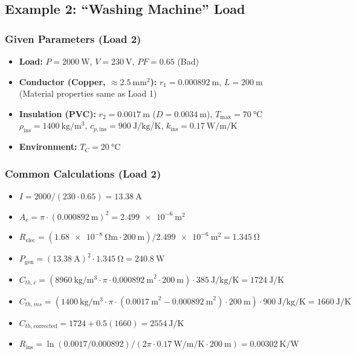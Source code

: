 \documentclass[11pt, a4paper]{article}
\begin{document}
\newpage

\subsection{Example 2: ``Washing Machine'' Load}

\subsubsection{Given Parameters (Load 2)}
\begin{itemize}
    \item \textbf{Load:} $P = \SI{2000}{\watt}$, $V = \SI{230}{\volt}$, $PF = 0.65$ (Bad)
    \item \textbf{Conductor (Copper, $\approx \SI{2.5}{\square\mm}$):}
        $r_1 = \SI{0.000892}{\metre}$, $L = \SI{200}{\metre}$ \\
        (Material properties same as Load 1)
    \item \textbf{Insulation (PVC):}
        $r_2 = \SI{0.0017}{\metre}$ ($D = \SI{0.0034}{\metre}$), $T_{\text{max}} = \SI{70}{\celsius}$ \\
        $\rho_{\text{ins}} = \SI{1400}{\kilogram\per\cubic\metre}$, $c_{p,\text{ins}} = \SI{900}{\joule\per\kilogram\per\kelvin}$, $k_{\text{ins}} = \SI{0.17}{\watt\per\metre\per\kelvin}$
    \item \textbf{Environment:} $T_C = \SI{20}{\celsius}$
\end{itemize}

\subsubsection{Common Calculations (Load 2)}
\begin{itemize}
    \item $I = 2000 / (230 \cdot 0.65) = \SI{13.38}{\ampere}$
    \item $A_c = \pi \cdot (\SI{0.000892}{\metre})^2 = \SI{2.499e-6}{\square\metre}$
    \item $R_{\text{elec}} = (\SI{1.68e-8}{\ohm\metre} \cdot \SI{200}{\metre}) / \SI{2.499e-6}{\square\metre} = \SI{1.345}{\ohm}$
    \item $P_{\text{gen}} = (\SI{13.38}{\ampere})^2 \cdot \SI{1.345}{\ohm} = \SI{240.8}{\watt}$
    \item $C_{th,c} = (\SI{8960}{\kilogram\per\cubic\metre} \cdot \pi \cdot \SI{0.000892}{\metre}^2 \cdot \SI{200}{\metre}) \cdot \SI{385}{\joule\per\kilogram\per\kelvin} = \SI{1724}{\joule\per\kelvin}$
    \item $C_{th,ins} = (\SI{1400}{\kilogram\per\cubic\metre} \cdot \pi \cdot (\SI{0.0017}{\metre}^2 - \SI{0.000892}{\metre}^2) \cdot \SI{200}{\metre}) \cdot \SI{900}{\joule\per\kilogram\per\kelvin} = \SI{1660}{\joule\per\kelvin}$
    \item $C_{th,\text{corrected}} = 1724 + 0.5(1660) = \SI{2554}{\joule\per\kelvin}$
    \item $R_{\text{ins}} = \ln(0.0017/0.000892) / (2\pi \cdot \SI{0.17}{\watt\per\metre\per\kelvin} \cdot \SI{200}{\metre}) = \SI{0.00302}{\kelvin\per\watt}$
\end{itemize}
\end{document}
